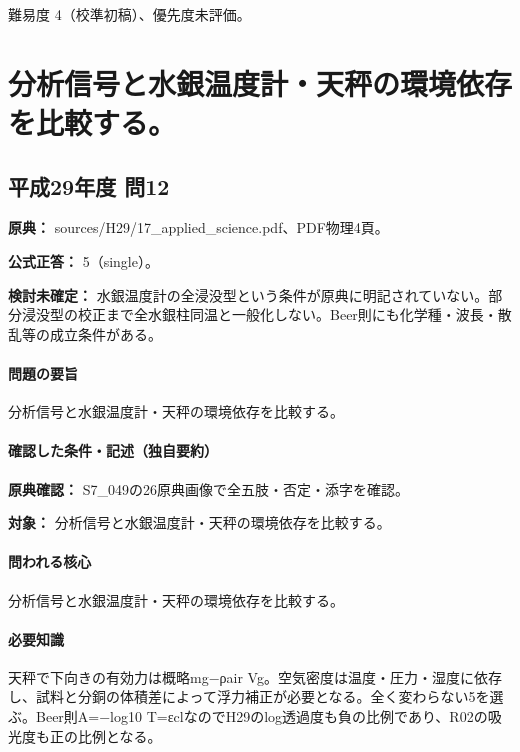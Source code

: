 \par 難易度 4（校準初稿）、優先度未評価。

\section{分析信号と水銀温度計・天秤の環境依存を比較する。}

\subsection{平成29年度 問12}
\label{q:h29-reg-applied-12}

\noindent\textbf{原典：} sources/H29/17\_applied\_science.pdf、PDF物理4頁。

\textbf{公式正答：} 5（single）。

\par\textbf{検討未確定：} 水銀温度計の全浸没型という条件が原典に明記されていない。部分浸没型の校正まで全水銀柱同温と一般化しない。Beer則にも化学種・波長・散乱等の成立条件がある。

\paragraph{問題の要旨} 分析信号と水銀温度計・天秤の環境依存を比較する。

\paragraph{確認した条件・記述（独自要約）}\mbox{}\par

\noindent\textbf{原典確認：} S7\_049の26原典画像で全五肢・否定・添字を確認。\par

\noindent\textbf{対象：} 分析信号と水銀温度計・天秤の環境依存を比較する。\par

\paragraph{問われる核心} 分析信号と水銀温度計・天秤の環境依存を比較する。

\paragraph{必要知識} 天秤で下向きの有効力は概略mg−ρair Vg。空気密度は温度・圧力・湿度に依存し、試料と分銅の体積差によって浮力補正が必要となる。全く変わらない5を選ぶ。Beer則A=−log10 T=εclなのでH29のlog透過度も負の比例であり、R02の吸光度も正の比例となる。

